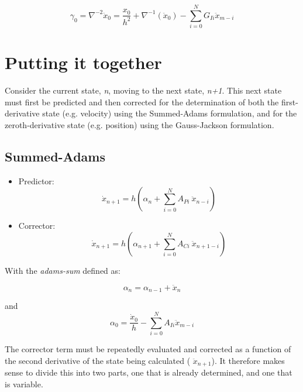 \begin{equation}
\gamma_0 = \nabla ^{-2}{\ddot{x}}_{0}=\frac{x_{0}}{h^{2}}+\nabla ^{-1}({\ddot{x}}_{0})-
\sum_{i=0}^{N}G_{Ii}{\ddot{x}}_{m-i}
\end{equation}


\section{Putting it together}

Consider the current state, \textit{n}, moving to the next state, \textit{n+1}.
This next state must first be predicted and then corrected for the
determination of both the first-derivative state (e.g. velocity) using
the Summed-Adams formulation, and for the zeroth-derivative state
(e.g. position) using the Gauss-Jackson formulation.

\subsection{Summed-Adams}\label{sec:math_form_summary_sa}
\begin{itemize}
 \item Predictor:
\begin{equation}\label{eq:sa_predictor}
\dot{x}_{n+1}=h\left(\alpha _{n}+\sum_{i=0}^{N}A_{Pi}\ \ddot{x}_{n-i}\right)
\end{equation}
\item Corrector:
\begin{equation}\label{eq:sa_corrector}
\dot{x}_{n+1}=h\left(\alpha_{n+1}+\sum_{i=0}^{N}A_{Ci}\ \ddot{x}_{n+1-i}\right)
\end{equation}
\end{itemize}


With the \textit{adams-sum} defined as:

\begin{equation*} 
\alpha_{n}= \alpha_{n-1}+\ddot{x}_n
\end{equation*}

and
\begin{equation*} 
\alpha_{0} =\frac{\dot{x}_0}{h}-\sum_{i=0}^{N}A_{Ii}\ddot{x}_{m-i}
\end{equation*}


The corrector term must be repeatedly evaluated and corrected as a
function of the second derivative of the state being calculated (
${\ddot{x}}_{n+1}$). It therefore makes sense to divide this into two
parts, one that is already determined, and one that is variable.

